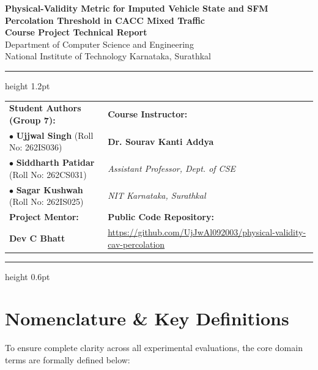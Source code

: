 \documentclass[11pt,a4paper]{article}
\begin{document}
\begin{center}
    {\LARGE \textbf{Physical-Validity Metric for Imputed Vehicle State and SFM Percolation Threshold in CACC Mixed Traffic}} \\[0.8em]
    {\large \textbf{Course Project Technical Report}} \\[0.3em]
    {\normalsize Department of Computer Science and Engineering} \\
    {\normalsize National Institute of Technology Karnataka, Surathkal}
\end{center}

\vspace{0.6em}
\hrule height 1.2pt
\vspace{0.8em}

\noindent
\begin{tabularx}{\textwidth}{@{} X X @{}}
    \textbf{Student Authors (Group 7):} & \textbf{Course Instructor:} \\
    \quad $\bullet$ \textbf{Ujjwal Singh} (Roll No: 262IS036) & \quad \textbf{Dr. Sourav Kanti Addya} \\
    \quad $\bullet$ \textbf{Siddharth Patidar} (Roll No: 262CS031) & \quad \textit{Assistant Professor, Dept. of CSE} \\
    \quad $\bullet$ \textbf{Sagar Kushwah} (Roll No: 262IS025) & \quad \textit{NIT Karnataka, Surathkal} \\[0.6em]
    \textbf{Project Mentor:} & \textbf{Public Code Repository:} \\
    \quad \textbf{Dev C Bhatt} & \quad \url{https://github.com/UjJwAl092003/physical-validity-cav-percolation}
\end{tabularx}

\vspace{0.6em}
\hrule height 0.6pt
\vspace{1.0em}

\section*{Nomenclature \& Key Definitions}
To ensure complete clarity across all experimental evaluations, the core domain terms are formally defined below:
\end{document}
